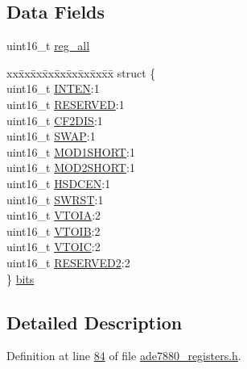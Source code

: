 \subsection*{Data Fields}
\begin{DoxyCompactItemize}
\item 
uint16\-\_\-t \hyperlink{a00024_a74e4d0cc3da3b66723322f38bfb7f371}{reg\-\_\-all}
\item 
\begin{tabbing}
xx\=xx\=xx\=xx\=xx\=xx\=xx\=xx\=xx\=\kill
struct \{\\
\>uint16\_t \hyperlink{a00024_a953a6f60e45da737e090044cd0d6db3e}{INTEN}:1\\
\>uint16\_t \hyperlink{a00024_a9484db76faad15bb8da293c622dd2269}{RESERVED}:1\\
\>uint16\_t \hyperlink{a00024_ab4c2cafa34b0206975dfbffd56985e68}{CF2DIS}:1\\
\>uint16\_t \hyperlink{a00024_afda78ad6c50702ee69a4fd0447531eea}{SWAP}:1\\
\>uint16\_t \hyperlink{a00024_a4bec96dba0eea9d340d3a75ee724ae5c}{MOD1SHORT}:1\\
\>uint16\_t \hyperlink{a00024_a8ace21342e72e662e3ada2f540f66586}{MOD2SHORT}:1\\
\>uint16\_t \hyperlink{a00024_a1a23d978426d0caed94827cc17de287d}{HSDCEN}:1\\
\>uint16\_t \hyperlink{a00024_a4987fcca11694bd2ffae6a773a9bfc24}{SWRST}:1\\
\>uint16\_t \hyperlink{a00024_a71343161503bcee74a5b6e0fb0a5fac0}{VTOIA}:2\\
\>uint16\_t \hyperlink{a00024_acfbe9cde66e39cf6b586d235b1c22a39}{VTOIB}:2\\
\>uint16\_t \hyperlink{a00024_a8d61be8a876c755db7ca7fb46404777b}{VTOIC}:2\\
\>uint16\_t \hyperlink{a00024_a5573848497a716a9947fd87487709feb}{RESERVED2}:2\\
\} \hyperlink{a00024_ae79b83e21321a2fd7febe825d5a4e903}{bits}\\

\end{tabbing}\end{DoxyCompactItemize}


\subsection{Detailed Description}


Definition at line \hyperlink{a00036_source_l00084}{84} of file \hyperlink{a00036_source}{ade7880\-\_\-registers.\-h}.



